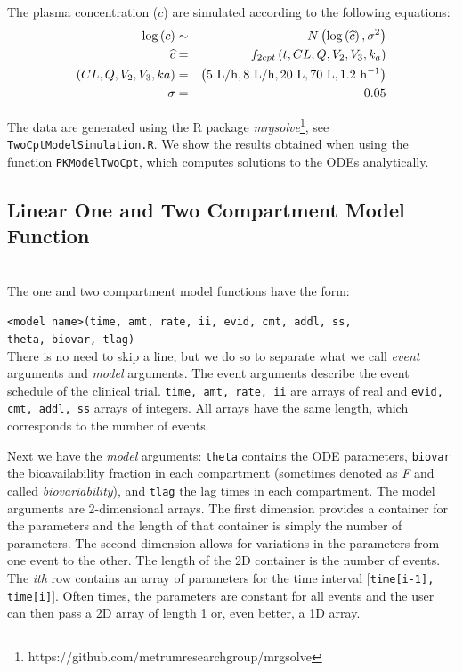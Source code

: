\documentclass[11pt]{amsart}
\begin{document}
The plasma concentration ($c$) are simulated according to the following equations:
\begin{eqnarray*}
\log\left(c\right) &\sim& N\left(\log\left(\widehat{c}\right),\sigma^2\right) \\
 \widehat{c} &=& f_{2cpt}\left(t, CL, Q, V_2, V_3, k_a\right) \\
  \left(CL, Q, V_2, V_3, ka\right) &=& 
	\left(5\ {\rm L/h}, 8\  {\rm L/h}, 20\  {\rm L},  70\ {\rm L}, 1.2\ {\rm h^{-1}} \right) \\
  \sigma &=& 0.05
\end{eqnarray*}

The data are generated using the R package \textit{mrgsolve}\footnote{https://github.com/metrumresearchgroup/mrgsolve}, see \texttt{TwoCptModelSimulation.R}. We show the results obtained when using the function \texttt{PKModelTwoCpt}, which computes solutions to the ODEs analytically.

\subsection{Linear One and Two Compartment Model Function} \ \\

The one and two compartment model functions have the form:

\texttt{<model name>(time, amt, rate, ii, evid, cmt, addl, ss,\\
\phantom{<model name>} theta,  biovar, tlag)} \\

There is no need to skip a line, but we do so to separate what we call \textit{event} arguments and \textit{model} arguments. The event arguments describe the event schedule of the clinical trial. \texttt{time, amt, rate, ii} are arrays of real and \texttt{evid, cmt, addl, ss} arrays of integers. All arrays have the same length, which corresponds to the number of events.

Next we have the \textit{model} arguments: \texttt{theta} contains the ODE parameters, \texttt{biovar} the bioavailability fraction in each compartment (sometimes denoted as \textit{F} and called \textit{biovariability}), and \texttt{tlag} the lag times in each compartment. The model arguments are 2-dimensional arrays. The first dimension provides a container for the parameters and the length of that container is simply the number of parameters. The second dimension allows for variations in the parameters from one event to the other. The length of the 2D container is the number of events. The \textit{ith} row contains an array of parameters for the time interval [\texttt{time[i-1], time[i]}]. Often times, the parameters are constant for all events and the user can then pass a 2D array of length 1 or, even better, a 1D array.
\end{document}

